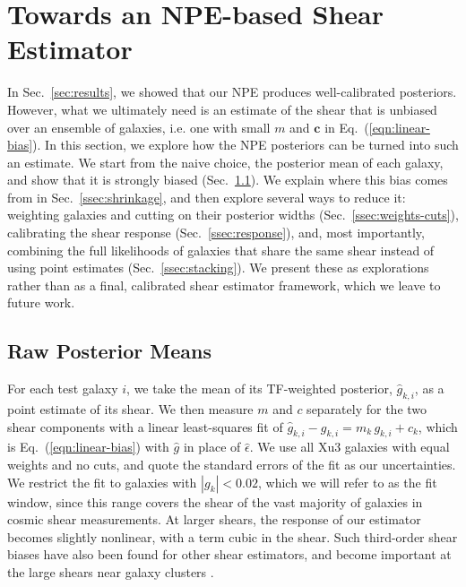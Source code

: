 \section{Towards an NPE-based Shear Estimator}
\label{sec:shear}

In Sec.~\ref{sec:results}, we showed that our NPE produces well-calibrated posteriors. However, what we ultimately need is an estimate of the shear that is unbiased over an ensemble of galaxies, i.e. one with small $m$ and $\mathbf{c}$ in Eq.~(\ref{eqn:linear-bias}). In this section, we explore how the NPE posteriors can be turned into such an estimate. We start from the naive choice, the posterior mean of each galaxy, and show that it is strongly biased (Sec.~\ref{ssec:raw-bias}). We explain where this bias comes from in Sec.~\ref{ssec:shrinkage}, and then explore several ways to reduce it: weighting galaxies and cutting on their posterior widths (Sec.~\ref{ssec:weights-cuts}), calibrating the shear response (Sec.~\ref{ssec:response}), and, most importantly, combining the full likelihoods of galaxies that share the same shear instead of using point estimates (Sec.~\ref{ssec:stacking}). We present these as explorations rather than as a final, calibrated shear estimator framework, which we leave to future work.

\subsection{Raw Posterior Means}
\label{ssec:raw-bias}

For each test galaxy $i$, we take the mean of its TF-weighted posterior, $\hat{g}_{k,i}$, as a point estimate of its shear. We then measure $m$ and $c$ separately for the two shear components with a linear least-squares fit of $\hat{g}_{k,i} - g_{k,i} = m_k\, g_{k,i} + c_k$, which is Eq.~(\ref{eqn:linear-bias}) with $\hat{g}$ in place of $\hat{\epsilon}$. We use all Xu3 galaxies with equal weights and no cuts, and quote the standard errors of the fit as our uncertainties. We restrict the fit to galaxies with $|g_k| < 0.02$, which we will refer to as the fit window, since this range covers the shear of the vast majority of galaxies in cosmic shear measurements. At larger shears, the response of our estimator becomes slightly nonlinear, with a term cubic in the shear. Such third-order shear biases have also been found for other shear estimators, and become important at the large shears near galaxy clusters \citep{Anacal, AnaCalCluster}.

